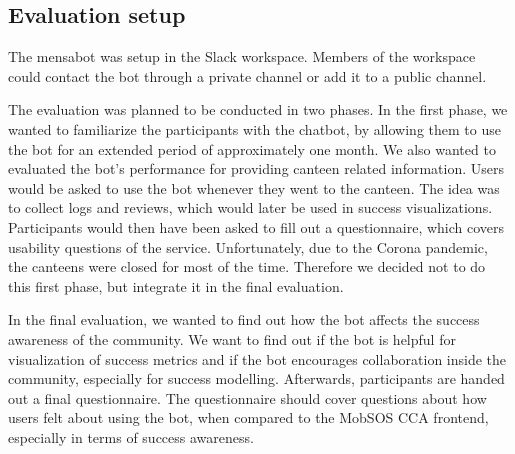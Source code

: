 \subsection{Evaluation setup}
The mensabot was setup in the Slack workspace. Members of the workspace could contact the bot through a private channel or add it to a public channel.

The evaluation was planned to be conducted in two phases.
In the first phase, we wanted to familiarize the participants with the chatbot, by allowing them to use the bot for an extended period of approximately one month. 
We also wanted to evaluated the bot's performance for providing canteen related information.
Users would be asked to use the bot whenever they went to the canteen. The idea was to collect logs and reviews, which would later be used in success visualizations. 
Participants would then have been asked to fill out a questionnaire, which covers usability questions of the service.  
Unfortunately, due to the Corona pandemic, the canteens were closed for most of the time. Therefore we decided not to do this first phase, but integrate it in the final evaluation.


In the final evaluation, we wanted to find out how the bot affects the success awareness of the community.
We want to find out if the bot is helpful for visualization of success metrics and if the bot encourages collaboration inside the community, especially for success modelling.
Afterwards, participants are handed out a final questionnaire.
The questionnaire should cover questions about how users felt about using the bot, when compared to the MobSOS CCA frontend, especially in terms of success awareness.